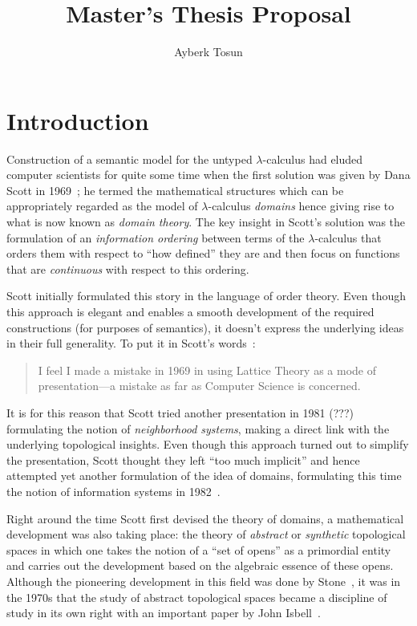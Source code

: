 \documentclass[11pt]{article}
\title{Master's Thesis Proposal}
\author{Ayberk Tosun}
\begin{document}
\maketitle

\section{Introduction}

Construction of a semantic model for the untyped $\lambda$-calculus had eluded computer
scientists for quite some time when the first solution was given by Dana Scott in
1969~\cite{scott:1969}; he termed the mathematical structures which can be appropriately
regarded as the model of $\lambda$-calculus \emph{domains} hence giving rise to what is now
known as \emph{domain theory}. The key insight in Scott's solution was the formulation of
an \emph{information ordering} between terms of the $\lambda$-calculus that orders them with
respect to ``how defined'' they are and then focus on functions that are \emph{continuous}
with respect to this ordering.

Scott initially formulated this story in the language of order theory. Even though this
approach is elegant and enables a smooth development of the required constructions (for
purposes of semantics), it doesn't express the underlying ideas in their full generality.
To put it in Scott's words~\cite[pg.~577]{scott:1982}:

\begin{quote}
  I feel I made a mistake in 1969 in using Lattice Theory as a mode of
  presentation---a mistake as far as Computer Science is concerned.
\end{quote}

It is for this reason that Scott tried another presentation in 1981 (???) formulating the
notion of \emph{neighborhood systems}, making a direct link with the underlying
topological insights. Even though this approach turned out to simplify the presentation,
Scott thought they left ``too much implicit'' and hence attempted yet another formulation
of the idea of domains, formulating this time the notion of information systems in
1982~\cite{scott:1982}.

Right around the time Scott first devised the theory of domains, a mathematical
development was also taking place: the theory of \emph{abstract} or \emph{synthetic}
topological spaces in which one takes the notion of a ``set of opens'' as a primordial
entity and carries out the development based on the algebraic essence of these opens.
Although the pioneering development in this field was done by Stone~\cite{stone:1934}, it
was in the 1970s that the study of abstract topological spaces became a discipline of
study in its own right with an important paper by John Isbell~\cite{isbell:1973}.
\end{document}
